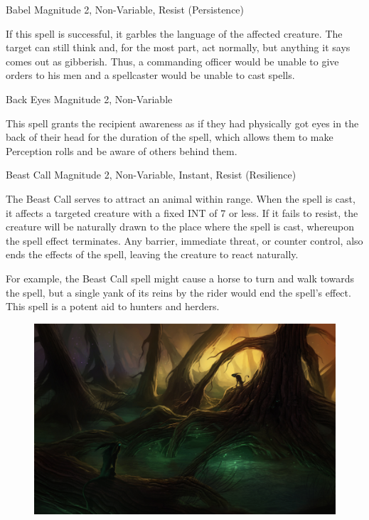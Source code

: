 \begin{rpg-spell}
{Babel}
{Magnitude 2, Non-Variable, Resist (Persistence)}

If this spell is successful, it garbles the language of the affected creature. The target can still think and, for the most part, act normally, but anything it says comes out as gibberish. Thus, a commanding officer would be unable to give orders to his men and a spellcaster would be unable to cast spells.
\end{rpg-spell}



\begin{rpg-spell}
{Back Eyes}
{Magnitude 2, Non-Variable}

This spell grants the recipient awareness as if they had physically got eyes in the back of their head for the duration of the spell, which allows them to make Perception rolls and be aware of others behind them.
\end{rpg-spell}



\begin{rpg-spell}
{Beast Call}
{Magnitude 2, Non-Variable, Instant, Resist (Resilience)}

The Beast Call serves to attract an animal within range. When the spell is cast, it affects a targeted creature with a fixed INT of 7 or less. If it fails to resist, the creature will be naturally drawn to the place where the spell is cast, whereupon the spell effect terminates. Any barrier, immediate threat, or counter control, also ends the effects of the spell, leaving the creature to react naturally. 

For example, the Beast Call spell might cause a horse to turn and walk towards the spell, but a single yank of its reins by the rider would end the spell’s effect. This spell is a potent aid to hunters and herders.
\end{rpg-spell}


\begin{figure}
\begin{center}
\includegraphics[scale=2.1]{img/mystical_forest_by_sirend.jpg}
\end{center}
\end{figure}


